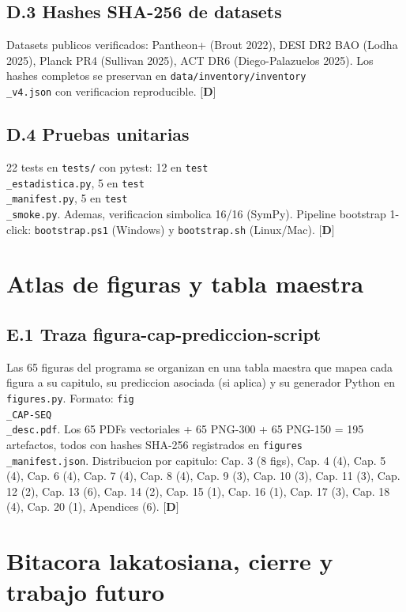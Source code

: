 ﻿\documentclass[11pt,letterpaper]{article}
\begin{document}
\subsection{D.3 Hashes SHA-256 de datasets}
Datasets publicos verificados: Pantheon+ (Brout 2022), DESI DR2 BAO (Lodha 2025), Planck PR4 (Sullivan 2025), ACT DR6 (Diego-Palazuelos 2025). Los hashes completos se preservan en \texttt{data/inventory/inventory\\\_v4.json} con verificacion reproducible. $\textbf{[D]}$
\subsection{D.4 Pruebas unitarias}
22 tests en \texttt{tests/} con pytest: 12 en \texttt{test\\\_estadistica.py}, 5 en \texttt{test\\\_manifest.py}, 5 en \texttt{test\\\_smoke.py}. Ademas, verificacion simbolica 16/16 (SymPy). Pipeline bootstrap 1-click: \texttt{bootstrap.ps1} (Windows) y \texttt{bootstrap.sh} (Linux/Mac). $\textbf{[D]}$
\section{Atlas de figuras y tabla maestra}
\subsection{E.1 Traza figura-cap-prediccion-script}
Las 65 figuras del programa se organizan en una tabla maestra que mapea cada figura a su capitulo, su prediccion asociada (si aplica) y su generador Python en \texttt{figures.py}. Formato: \texttt{fig\\\_CAP-SEQ\\\_desc.pdf}. Los 65 PDFs vectoriales + 65 PNG-300 + 65 PNG-150 = 195 artefactos, todos con hashes SHA-256 registrados en \texttt{figures\\\_manifest.json}. Distribucion por capitulo: Cap. 3 (8 figs), Cap. 4 (4), Cap. 5 (4), Cap. 6 (4), Cap. 7 (4), Cap. 8 (4), Cap. 9 (3), Cap. 10 (3), Cap. 11 (3), Cap. 12 (2), Cap. 13 (6), Cap. 14 (2), Cap. 15 (1), Cap. 16 (1), Cap. 17 (3), Cap. 18 (4), Cap. 20 (1), Apendices (6). $\textbf{[D]}$
\section{Bitacora lakatosiana, cierre y trabajo futuro}
\end{document}
